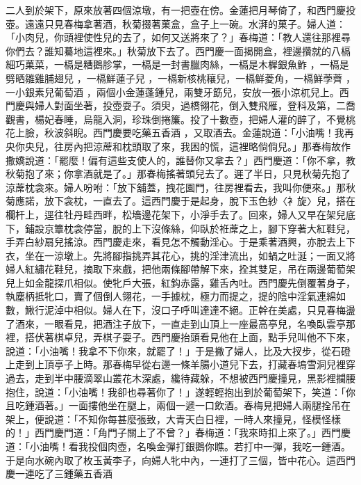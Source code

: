 \begin{showcontents}{}
二人到於架下，原來放著四個涼墩，有一把壺在傍。金蓮把月琴倚了，和西門慶投壺。遠遠只見春梅拿著酒，秋菊掇著菓盒，盒子上一碗。水湃的菓子。婦人道：「小肉兒，你頭裡使性兒的去了，如何又送將來了？」春梅道：「教人還往那裡尋你們去？誰知驀地這裡來。」秋菊放下去了。西門慶一面揭開盒，裡邊攢就的八槅細巧菓菜，一槅是糟鵝胗掌，一槅是一封書臘肉絲，一槅是木樨銀魚鮓 ，一槅是劈晒雛雞脯翅兒 ，一槅鮮蓮子兒 ，一槅新核桃穰兒，一槅鮮菱角，一槅鮮荸薺 ，一小銀素兒葡萄酒 ，兩個小金蓮蓬鍾兒，兩雙牙筯兒，安放一張小涼杌兒上。西門慶與婦人對面坐著，投壺耍子。須臾，過橋翎花，倒入雙飛雁，登科及第，二喬觀書，楊妃春睡，烏龍入洞，珍珠倒捲簾。投了十數壺，把婦人灌的醉了，不覺桃花上臉，秋波斜睨。西門慶要吃藥五香酒 ，又取酒去。金蓮說道：「小油嘴！我再央你央兒，往房內把涼蓆和枕頭取了來，我困的慌，這裡略倘倘兒。」那春梅故作撒嬌說道：「罷麼！偏有這些支使人的，誰替你又拿去？」西門慶道：「你不拿，教秋菊抱了來；你拿酒就是了。」那春梅搖著頭兒去了。遲了半日，只見秋菊先抱了涼蓆枕衾來。婦人吩咐：「放下舖蓋，拽花園門，往房裡看去，我叫你便來。」那秋菊應諾，放下衾枕，一直去了。這西門慶于是起身，脫下玉色紗〈衤旋〉兒，搭在欄杆上，逕往牡丹畦西畔，松墻邊花架下，小淨手去了。回來，婦人又早在架兒底下，鋪設京簟枕衾停當，脫的上下沒條絲，仰臥於袵蓆之上，腳下穿著大紅鞋兒，手弄白紗扇兒搖涼。西門慶走來，看見怎不觸動淫心。于是乘著酒興，亦脫去上下衣，坐在一涼墩上。先將腳指挑弄其花心，挑的淫津流出，如蝸之吐涎；一面又將婦人紅繡花鞋兒，摘取下來戲，把他兩條腳帶解下來，拴其雙足，吊在兩邊葡萄架兒上如金龍探爪相似。使牝戶大張，紅鈎赤露，雞舌內吐。西門慶先倒覆著身子，執塵柄抵牝口，賣了個倒人翎花，一手據枕，極力而提之，提的陰中淫氣連綿如數，鰍行泥淖中相似。婦人在下，沒口子呼叫達達不絕。正幹在美處，只見春梅盪了酒來，一眼看見，把酒注子放下，一直走到山頂上一座最高亭兒，名喚臥雲亭那裡，搭伏著棋卓兒，弄棋子耍子。西門慶抬頭看見他在上面，點手兒叫他不下來，說道：「小油嘴！我拿不下你來，就罷了！」于是撇了婦人，比及大扠步，從石磴上走到上頂亭子上時。那春梅早從右邊一條羊腸小道兒下去，打藏春塢雪洞兒裡穿過去，走到半中腰滴翠山叢花木深處，纔待藏躲，不想被西門慶撞見，黑影裡攔腰抱住，說道：「小油嘴！我卻也尋著你了！」遂輕輕抱出到於葡萄架下，笑道：「你且吃鍾酒著。」一面摟他坐在腿上，兩個一遞一口飲酒。春梅見把婦人兩腿拴吊在架上，便說道：「不知你每甚麼張致，大青天白日裡，一時人來撞見，怪模怪樣的！」西門慶門道：「角門子關上了不曾？」春梅道：「我來時扣上來了。」西門慶道：「小油嘴！看我投個肉壺，名喚金彈打銀鵝你瞧。若打中一彈，我吃一鍾酒。于是向水碗內取了枚玉黃李子，向婦人牝中內，一連打了三個，皆中花心。這西門慶一連吃了三鍾藥五香酒 
\end{showcontents}
